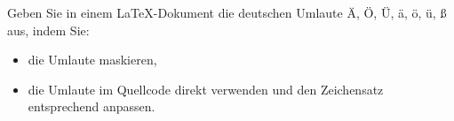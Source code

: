 Geben Sie in einem \LaTeX-Dokument die deutschen Umlaute Ä, Ö, Ü, ä, ö, ü, ß aus, indem Sie:
\begin{itemize}
	\item die Umlaute maskieren,
	\item die Umlaute im Quellcode direkt verwenden und den Zeichensatz entsprechend anpassen.
\end{itemize}